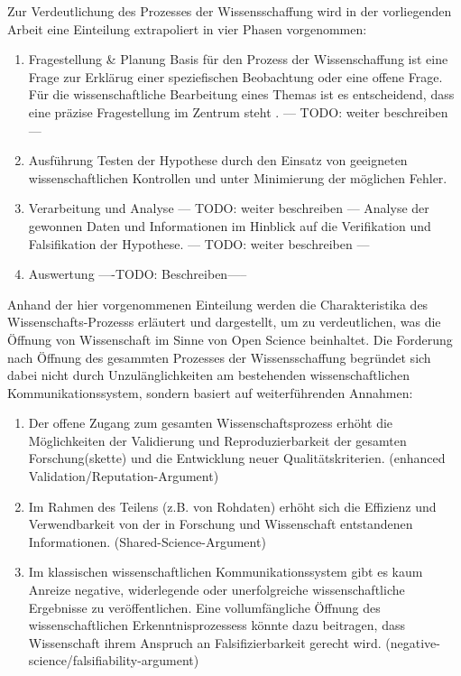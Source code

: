 Zur Verdeutlichung des Prozesses der Wissensschaffung wird in der vorliegenden Arbeit eine Einteilung extrapoliert in vier Phasen vorgenommen:
\begin{enumerate}
\item Fragestellung & Planung
Basis für den Prozess der Wissenschaffung ist eine Frage zur Erklärug einer speziefischen Beobachtung oder eine offene Frage\cite{suchen}. Für die wissenschaftliche Bearbeitung eines Themas ist es entscheidend, dass eine präzise Fragestellung im Zentrum steht \cite{suchen}. --- TODO: weiter beschreiben ---
\item Ausführung
Testen der Hypothese durch den Einsatz von geeigneten wissenschaftlichen Kontrollen und unter Minimierung der möglichen Fehler.
\item Verarbeitung und Analyse --- TODO: weiter beschreiben ---
Analyse der gewonnen Daten und Informationen im Hinblick auf die Verifikation und Falsifikation der Hypothese. --- TODO: weiter beschreiben ---
\item Auswertung
----TODO: Beschreiben-----
\end{enumerate}

Anhand der hier vorgenommenen Einteilung werden die Charakteristika des Wissenschafts-Prozesss erläutert und dargestellt, um zu verdeutlichen, was die Öffnung von Wissenschaft im Sinne von Open Science beinhaltet. Die Forderung nach Öffnung des gesammten Prozesses der Wissensschaffung begründet sich dabei nicht durch Unzulänglichkeiten am bestehenden wissenschaftlichen Kommunikationssystem, sondern basiert auf weiterführenden Annahmen:

\begin{enumerate}
\item Der offene Zugang zum gesamten Wissenschaftsprozess erhöht die Möglichkeiten der Validierung und Reproduzierbarkeit der gesamten Forschung(skette) und die Entwicklung neuer Qualitätskriterien. (enhanced Validation/Reputation-Argument)
\item Im Rahmen des Teilens (z.B. von Rohdaten) erhöht sich die Effizienz und Verwendbarkeit von der in Forschung und Wissenschaft entstandenen Informationen. (Shared-Science-Argument)
\item Im klassischen wissenschaftlichen Kommunikationssystem gibt es kaum Anreize negative, widerlegende oder unerfolgreiche wissenschaftliche Ergebnisse zu veröffentlichen. Eine vollumfängliche Öffnung des wissenschaftlichen Erkenntnisprozessess könnte dazu beitragen, dass Wissenschaft ihrem Anspruch an Falsifizierbarkeit gerecht wird. (negative-science/falsifiability-argument)
\end{enumerate}

